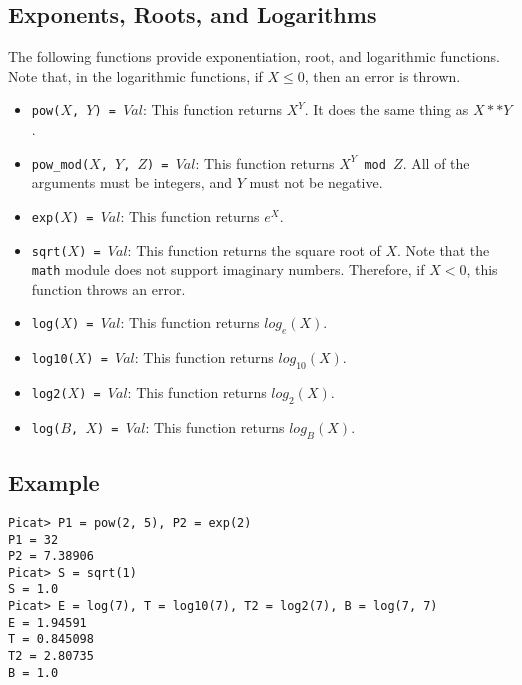 \subsection{Exponents, Roots, and Logarithms}
The following functions provide exponentiation, root, and logarithmic functions.  Note that, in the logarithmic functions, if $X \le 0$, then an error is thrown.
\begin{itemize}
\item \texttt{pow($X$, $Y$) = $Val$}:  This function returns $X^Y$.  It does the same thing as $X ** Y$.
\item \texttt{pow\_mod($X$, $Y$, $Z$) = $Val$}:  This function returns \texttt{$X^Y$ mod $Z$}.  All of the arguments must be integers, and $Y$ must not be negative.
\item \texttt{exp($X$) = $Val$}:  This function returns $e^X$.
\item \texttt{sqrt($X$) = $Val$}: This function returns the square root of $X$.  Note that the \texttt{math} module does not support imaginary numbers.  Therefore, if $X < 0$, this function throws an error.
\item \texttt{log($X$) = $Val$}: This function returns $log_e(X)$.
\item \texttt{log10($X$) = $Val$}: This function returns $log_{10}(X)$.
\item \texttt{log2($X$) = $Val$}: This function returns $log_2(X)$.
\item \texttt{log($B$, $X$) = $Val$}:  This function returns $log_B(X)$.
\end{itemize}

\subsection*{Example}
\begin{verbatim}
Picat> P1 = pow(2, 5), P2 = exp(2)
P1 = 32
P2 = 7.38906
Picat> S = sqrt(1)
S = 1.0
Picat> E = log(7), T = log10(7), T2 = log2(7), B = log(7, 7)
E = 1.94591
T = 0.845098
T2 = 2.80735
B = 1.0
\end{verbatim}

